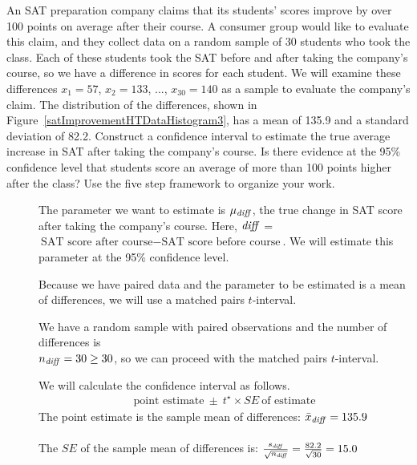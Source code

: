 \begin{examplewrap}
\begin{nexample}
{An SAT preparation company claims that its students' scores improve by over 100 points on average after their course. A consumer group would like to evaluate this claim, and they collect data on a random sample of 30 students who took the class. Each of these students took the SAT before and after taking the company's course, so we have a difference in scores for each student. We will examine these differences $x_1=57$, $x_2=133$, ..., $x_{30}=140$ as a sample to evaluate the company's claim. The distribution of the differences, shown in Figure~\ref{satImprovementHTDataHistogram3}, has a mean of 135.9 and a standard deviation of 82.2. Construct a confidence interval to estimate the true average increase in SAT after taking the company's course.  Is there evidence at the 95\% confidence level that students score an average of more than 100 points higher after the class?  Use the five step framework to organize your work.  
}
\begin{description}
\item[] The parameter we want to estimate is $\mu_{\text{\emph{diff}}}$, the true change in SAT score after taking the company's course.  Here,  ${\text{\emph{diff}}}$ = ${\text{SAT score after course} - \text{SAT score before course}}$.  We will estimate this parameter at the 95\% confidence level.

\item[] Because we have paired data and the parameter to be estimated is a mean of differences, we will use a matched pairs $t$-interval.

\item[] We have a random sample with paired observations and the number of differences is \\
$n_{\text{\emph{diff}}}=30\ge 30$, so we can proceed with the matched pairs $t$-interval.  
 
\item[]  We will calculate the confidence interval as follows.
\begin{align*}
\text{point estimate}\ \pm\ t^{\star} \times SE\ \text{of estimate}
\end{align*}
The point estimate is the sample mean of differences: $\bar{x}_{\text{\emph{diff}}} = 135.9$\\
\\
The $SE$ of the sample mean of differences is: $ \frac{s_{\text{\emph{diff}}}}{\sqrt{n_{\text{\emph{diff}}}}} = \frac{82.2}{\sqrt{30}}=15.0$\\


\end{description}
\end{nexample}
\end{examplewrap}
